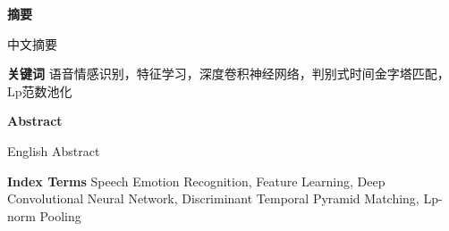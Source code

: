 \noindent{}
\begin{center}\textbf{摘要}\quad{}\end{center}

中文摘要

\vskip 0.5cm
\noindent{}\textbf{关键词}\quad{}
语音情感识别，特征学习，深度卷积神经网络，判别式时间金字塔匹配，Lp范数池化


\newpage
\begin{center}\textbf{Abstract}\quad{}\end{center}

English Abstract


\vskip 0.5cm
\noindent{}\textbf{Index Terms}\quad{}
Speech Emotion Recognition, Feature Learning, Deep Convolutional Neural Network, Discriminant Temporal Pyramid Matching, Lp-norm Pooling  